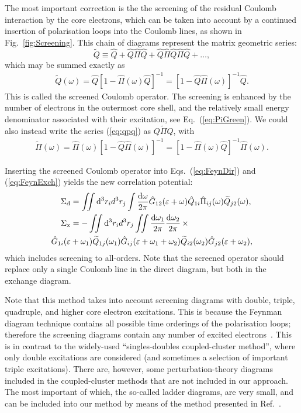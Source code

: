 \documentclass[10pt,twocolumn,a4paper]{article}%
\newcommand{\be}{\begin{equation}}
\newcommand{\ee}{\end{equation}}
\def\d{\ensuremath{{\rm d}}}
\def\en{\ensuremath{\varepsilon}}
\newcommand{\w}{\ensuremath{\omega}}
\begin{document}
The most important correction is the the screening of the residual Coulomb interaction by the core electrons, which can be taken into account by a continued insertion of polarisation loops into the Coulomb lines, as shown in Fig.~\ref{fig:Screening}.
This chain of diagrams represent the matrix geometric series:
\be\label{eq:qpq}
\widetilde Q \equiv \hat Q + \hat Q\hat \Pi \hat Q + \hat Q\hat \Pi \hat Q\hat \Pi \hat Q+\ldots,
\ee
which may be summed exactly as
\begin{align}\label{eq:ScreenQ}
\widetilde Q(\w) = \hat Q\left[1-\hat\Pi(\w)\hat Q\right]^{-1}
							= \left[1-\hat Q\hat\Pi(\w)\right]^{-1} \hat Q.
\end{align}
This is called the screened Coulomb operator.
The screening is enhanced by the number of electrons in the outermost core shell, and the relatively small energy denominator associated with their excitation, see Eq.~(\ref{eq:PiGreen}).
We could also instead write the series (\ref{eq:qpq}) as $Q\widetilde \Pi Q$, with
\begin{align}\label{eq:ScreenPi}
\widetilde \Pi(\w) = \hat \Pi(\w)\left[1-\hat Q\hat\Pi(\w)\right]^{-1}
							= \left[1-\hat\Pi(\w)\hat Q\right]^{-1} \hat \Pi(\w).
\end{align}

Inserting the screened Coulomb operator into Eqs.~(\ref{eq:FeynDir}) and (\ref{eq:FeynExch}) yields the new correlation potential:
\begin{align}
\Sigma_{\rm d}
&= \iint\d^3 r_id^3 r_j
\int\frac{\d\w}{2\pi}\hat G_{12}(\en+\w)\hat Q_{1i}\hat\Pi_{ij}(\w)\widetilde Q_{j2}(\w),
\label{eq:SigmaAll-dir}
\\
\Sigma_{\rm x}
&= -\iint\d^3 r_id^3 r_j
\iint\frac{\d\w_1}{2\pi}\frac{\d\w_2}{2\pi} \, \times \notag\\
\label{eq:SigmaAll-exch}
\hat G_{1i}(\en&+\w_1)\widetilde Q_{1j}(\w_1) \hat G_{ij}(\en+\w_1+\w_2)\widetilde Q_{i2}(\w_2)\hat G_{j2}(\en+\w_2),
\end{align}
which includes screening to all-orders.
Note that the screened  operator should replace only a single Coulomb line in the direct diagram, but both in the exchange diagram.

Note that this method takes into account screening diagrams with double, triple, quadruple, and higher core electron excitations.
This is because the Feynman diagram technique contains all possible time orderings of the polarisation loops; therefore the screening diagrams contain any number of excited electrons~\cite{DzubaCPM1988pla}.
This is in contrast to the widely-used ``singles-doubles coupled-cluster method'', where only double excitations are considered (and sometimes a selection of important triple excitations).
There are, however, some perturbation-theory diagrams included in the coupled-cluster methods that are not included in our approach.
The most important of which, the so-called ladder diagrams, are very small, and  can be included into our method by means of the method presented in Ref.~\cite{DzubaLadder2008}.
\end{document}

